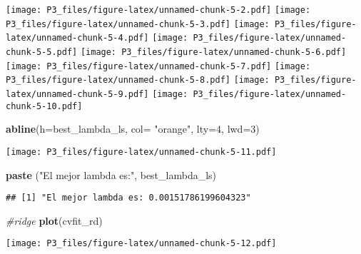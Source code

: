 \documentclass[]{article}
\newenvironment{Shaded}{\begin{snugshade}}{\end{snugshade}}
\newcommand{\KeywordTok}[1]{\textcolor[rgb]{0.13,0.29,0.53}{\textbf{#1}}}
\newcommand{\DataTypeTok}[1]{\textcolor[rgb]{0.13,0.29,0.53}{#1}}
\newcommand{\DecValTok}[1]{\textcolor[rgb]{0.00,0.00,0.81}{#1}}
\newcommand{\StringTok}[1]{\textcolor[rgb]{0.31,0.60,0.02}{#1}}
\newcommand{\CommentTok}[1]{\textcolor[rgb]{0.56,0.35,0.01}{\textit{#1}}}
\newcommand{\OperatorTok}[1]{\textcolor[rgb]{0.81,0.36,0.00}{\textbf{#1}}}
\newcommand{\NormalTok}[1]{#1}
\begin{document}
\begin{Shaded}
\end{Shaded}

\texttt{[image: P3\_files/figure-latex/unnamed-chunk-5-2.pdf]}
\texttt{[image: P3\_files/figure-latex/unnamed-chunk-5-3.pdf]}
\texttt{[image: P3\_files/figure-latex/unnamed-chunk-5-4.pdf]}
\texttt{[image: P3\_files/figure-latex/unnamed-chunk-5-5.pdf]}
\texttt{[image: P3\_files/figure-latex/unnamed-chunk-5-6.pdf]}
\texttt{[image: P3\_files/figure-latex/unnamed-chunk-5-7.pdf]}
\texttt{[image: P3\_files/figure-latex/unnamed-chunk-5-8.pdf]}
\texttt{[image: P3\_files/figure-latex/unnamed-chunk-5-9.pdf]}
\texttt{[image: P3\_files/figure-latex/unnamed-chunk-5-10.pdf]}

\begin{Shaded}
\begin{Highlighting}[]
\KeywordTok{abline}\NormalTok{(}\DataTypeTok{h=}\NormalTok{best_lambda_ls, }\DataTypeTok{col=} \StringTok{"orange"}\NormalTok{, }\DataTypeTok{lty=}\DecValTok{4}\NormalTok{, }\DataTypeTok{lwd=}\DecValTok{3}\NormalTok{)}
\end{Highlighting}
\end{Shaded}

\texttt{[image: P3\_files/figure-latex/unnamed-chunk-5-11.pdf]}

\begin{Shaded}
\begin{Highlighting}[]
\KeywordTok{paste}\NormalTok{ (}\StringTok{"El mejor lambda es:"}\NormalTok{, best_lambda_ls)}
\end{Highlighting}
\end{Shaded}

\begin{verbatim}
## [1] "El mejor lambda es: 0.00151786199604323"
\end{verbatim}

\begin{Shaded}
\begin{Highlighting}[]
\CommentTok{#ridge}
\KeywordTok{plot}\NormalTok{(cvfit_rd)}
\end{Highlighting}
\end{Shaded}

\texttt{[image: P3\_files/figure-latex/unnamed-chunk-5-12.pdf]}

\begin{Shaded}
\end{Shaded}
\end{document}
